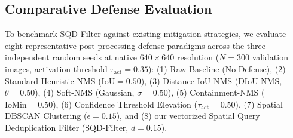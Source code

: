 \documentclass[preprint,12pt]{elsarticle}
\begin{document}
\subsection{Comparative Defense Evaluation}
To benchmark SQD-Filter against existing mitigation strategies, we evaluate eight representative post-processing defense paradigms across the three independent random seeds at native $640\times 640$ resolution ($N=300$ validation images, activation threshold $\tau_{\mathrm{act}}=0.35$): (1) Raw Baseline (No Defense), (2) Standard Heuristic NMS ($\mathrm{IoU}=0.50$), (3) Distance-IoU NMS (DIoU-NMS, $\theta=0.50$), (4) Soft-NMS (Gaussian, $\sigma=0.50$), (5) Containment-NMS ($\mathrm{IoMin}=0.50$), (6) Confidence Threshold Elevation ($\tau_{\mathrm{act}}=0.50$), (7) Spatial DBSCAN Clustering ($\epsilon=0.15$), and (8) our vectorized Spatial Query Deduplication Filter (SQD-Filter, $d=0.15$).
\end{document}
